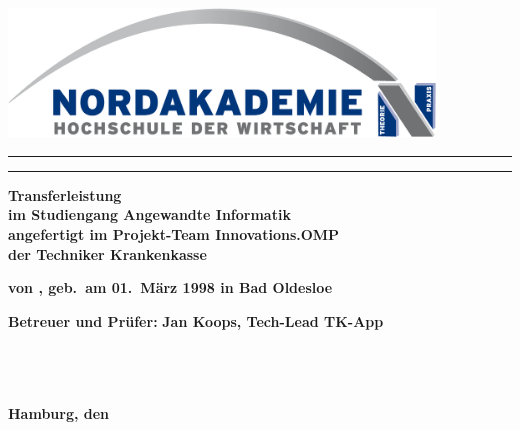 
\thispagestyle{empty}
\begin{center}
\vspace*{-2cm}
\includegraphics[width=0.85\textwidth]{Bilder/Logo_NAK}\\
\vspace*{1.5cm}
    {\huge \onehalfspacing{}
    \color[RGB]{91,155,213}
        \noindent\rule{\textwidth}{0.4pt}
            \thetitle{}
            \vspace*{-3mm}
        \noindent\rule{\textwidth}{0.4pt}

    \par}%
   \vfill
    {\normalfont\normalcolor\bfseries
	\large
	Transferleistung \\
	\large
	im Studiengang Angewandte Informatik\\
	angefertigt im Projekt-Team Innovations.OMP\\
	der Techniker Krankenkasse\\
    \par}%
\end{center}\par
\vspace*{2.5cm}
\noindent\begin{minipage}[b]{\textwidth}
{
  \noindent \textbf{von \theauthor, geb.~am 01.~März 1998 in Bad Oldesloe}\\

  \begin{tabbing}
  \textbf{Betreuer und Prüfer:}  \= \textbf{Jan Koops, Tech-Lead TK-App}\\
  \\
  \\
  \\
  \end{tabbing}

  \noindent \textbf{Hamburg, den \thedate}
  }
\end{minipage}
